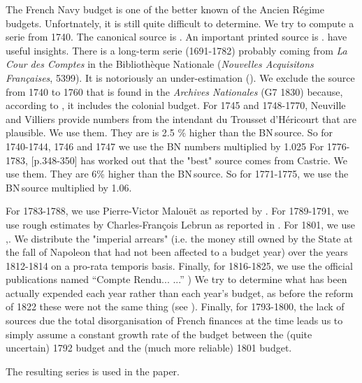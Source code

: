 \documentclass[12pt,a4paper,notitlepage,english]{article}
\begin{document}
\begin{appendix}
The French Navy budget is one of the better known of the Ancien Régime budgets. Unfortnately, it is still quite difficult to determine. We try to compute a serie from 1740.
The canonical source is \cite{Legoherel1965}.
An important printed source is \cite{Neuville1898}. \cite{Dull1975, Villiers2002} have useful insights.
There is a long-term serie (1691-1782) probably coming from \textit{La Cour des Comptes} in the Bibliothèque Nationale (\textit{Nouvelles Acquisitons Françaises}, 5399).
It is notoriously an under-estimation (\cite{Villiers2002}).
We exclude the source from 1740 to 1760 that is found in the \textit{Archives Nationales} (G7 1830) because, according to \cite{Villiers2002}, it includes the colonial budget.
For 1745 and 1748-1770, Neuville and Villiers provide numbers from the intendant du Trousset d’Héricourt that are plausible.
We use them.
They are is 2.5 \% higher than the BN source.
So for 1740-1744, 1746 and 1747 we use the BN numbers multiplied by 1.025
For 1776-1783, \cite{Dull1975}[p.348-350] has worked out that the "best" source comes from Castrie.
We use them.
They are 6\% higher than the BN source.
So for 1771-1775, we use the BN source multiplied by 1.06.

For 1783-1788, we use Pierre-Victor Malouët as reported by \cite{Villiers2002}. For 1789-1791, we use rough estimates by Charles-François Lebrun as reported in \cite[][ p. 259 and 332]{Marion1914}. For 1801, we use \cite{Branda2007},. We distribute the "imperial arrears" (i.e. the money still owned by the State at the fall of Napoleon that had not been affected to a budget year) over the years 1812-1814 on a pro-rata temporis basis.
Finally, for 1816-1825, we use the official publications named ``Compte Rendu... ...'' \citep{1814,1818,1826})
We try to determine what has been actually expended each year rather than each year’s budget, as before the reform of 1822 these were not the same thing (see \cite{Kott2019}).
Finally, for 1793-1800, the lack of sources due the total disorganisation of French finances at the time leads us to simply assume a constant growth rate of the budget between the (quite uncertain) 1792 budget and the (much more reliable) 1801 budget.

The resulting series is used in the paper.






\end{appendix}

\tableofcontents

\listoftodos[Notes]
\end{document}
